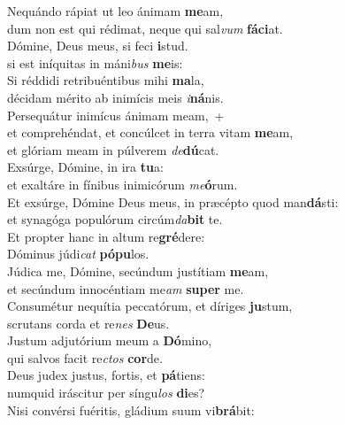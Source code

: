 \evenverse Nequándo rápiat ut leo ánimam \textbf{me}am,~\*\\
\evenverse dum non est qui rédimat, neque qui sal\textit{vum} \textbf{fá}\textbf{ci}at.\\
\oddverse Dómine, Deus meus, si feci \textbf{i}stud.~\*\\
\oddverse si est iníquitas in máni\textit{bus} \textbf{me}is:\\
\evenverse Si réddidi retribuéntibus mihi \textbf{ma}la,~\*\\
\evenverse décidam mérito ab inimícis meis \textit{i}\textbf{ná}nis.\\
\oddverse Persequátur inimícus ánimam meam,~+\\
\oddverse  et comprehéndat, et concúlcet in terra vitam \textbf{me}am,~\*\\
\oddverse et glóriam meam in púlverem \textit{de}\textbf{dú}cat.\\
\evenverse Exsúrge, Dómine, in ira \textbf{tu}a:~\*\\
\evenverse et exaltáre in fínibus inimicórum \textit{me}\textbf{ó}rum.\\
\oddverse Et exsúrge, Dómine Deus meus, in præcépto quod man\textbf{dá}sti:~\*\\
\oddverse et synagóga populórum circúm\textit{da}\textbf{bit} te.\\
\evenverse Et propter hanc in altum re\textbf{gré}dere:~\*\\
\evenverse Dóminus júdi\textit{cat} \textbf{pó}\textbf{pu}los.\\
\oddverse Júdica me, Dómine, secúndum justítiam \textbf{me}am,~\*\\
\oddverse et secúndum innocéntiam me\textit{am} \textbf{su}\textbf{per} me.\\
\evenverse Consumétur nequítia peccatórum, et díriges \textbf{ju}stum,~\*\\
\evenverse scrutans corda et re\textit{nes} \textbf{De}us.\\
\oddverse Justum adjutórium meum a \textbf{Dó}mino,~\*\\
\oddverse qui salvos facit re\textit{ctos} \textbf{cor}de.\\
\evenverse Deus judex justus, fortis, et \textbf{pá}tiens:~\*\\
\evenverse numquid iráscitur per síngu\textit{los} \textbf{di}es?\\
\oddverse Nisi convérsi fuéritis, gládium suum vi\textbf{brá}bit:~\*\\
